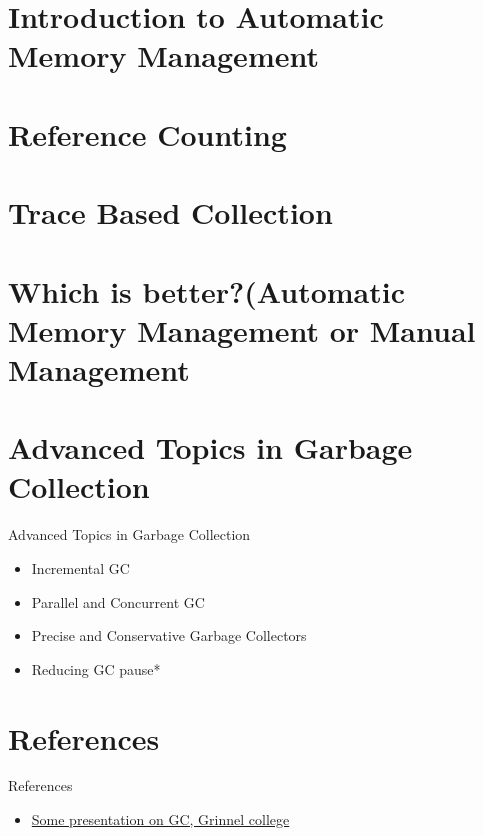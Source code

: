\documentclass[
  10pt,
  ignorenonframetext,
]{beamer}
\providecommand{\tightlist}{%
  \setlength{\itemsep}{0pt}\setlength{\parskip}{0pt}}
\begin{document}
\hypertarget{introduction-to-automatic-memory-management}{%
\section{Introduction to Automatic Memory
Management}\label{introduction-to-automatic-memory-management}}

\hypertarget{reference-counting}{%
\section{Reference
Counting}\label{reference-counting}}

\hypertarget{trace-based-collection}{%
\section{Trace Based
Collection}\label{trace-based-collection}}

\hypertarget{which-is-betterautomatic-memory-management-or-manual-management}{%
\section{Which is better?(Automatic Memory
Management or Manual
Management}\label{which-is-betterautomatic-memory-management-or-manual-management}}

\hypertarget{advanced-topics-in-garbage-collection}{%
\section{Advanced Topics in Garbage
Collection}\label{advanced-topics-in-garbage-collection}}

\begin{frame}{Advanced Topics in Garbage
Collection}
\begin{itemize}
\item
  Incremental GC
\item
  Parallel and Concurrent GC
\item
  Precise and Conservative Garbage Collectors
\item
  Reducing GC pause*
\end{itemize}
\end{frame}

\hypertarget{references}{%
\section{References}\label{references}}

\begin{frame}{References}
\begin{itemize}
\tightlist
\item
  \href{https://rebelsky.cs.grinnell.edu/Courses/CS302/99S/Presentations/GC/}{Some
  presentation on GC, Grinnel college}
\end{itemize}
\end{frame}
\end{document}
